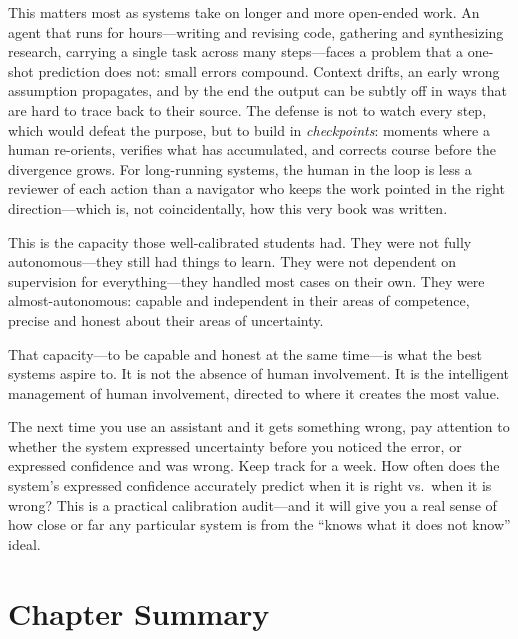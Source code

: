 This matters most as \ai systems take on longer and more open-ended work. An agent that runs for hours---writing and revising code, gathering and synthesizing research, carrying a single task across many steps---faces a problem that a one-shot prediction does not: small errors compound. Context drifts, an early wrong assumption propagates, and by the end the output can be subtly off in ways that are hard to trace back to their source. The defense is not to watch every step, which would defeat the purpose, but to build in \emph{checkpoints}: moments where a human re-orients, verifies what has accumulated, and corrects course before the divergence grows. For long-running systems, the human in the loop is less a reviewer of each action than a navigator who keeps the work pointed in the right direction---which is, not coincidentally, how this very book was written.

\begin{keyconcept}
This is the capacity those well-calibrated students had. They were not fully autonomous---they still had things to learn. They were not dependent on supervision for everything---they handled most cases on their own. They were almost-autonomous: capable and independent in their areas of competence, precise and honest about their areas of uncertainty.

That capacity---to be capable and honest at the same time---is what the best \hitl systems aspire to. It is not the absence of human involvement. It is the intelligent management of human involvement, directed to where it creates the most value.
\end{keyconcept}

\begin{trythis}
The next time you use an \ai assistant and it gets something wrong, pay attention to whether the system expressed uncertainty before you noticed the error, or expressed confidence and was wrong. Keep track for a week. How often does the system's expressed confidence accurately predict when it is right vs.\ when it is wrong? This is a practical calibration audit---and it will give you a real sense of how close or far any particular system is from the ``knows what it does not know'' ideal.
\end{trythis}

\section*{Chapter Summary}

